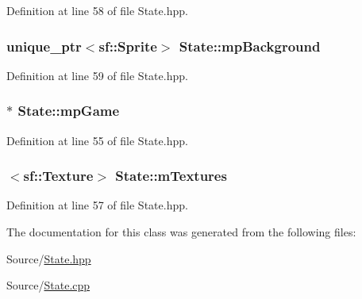 Definition at line 58 of file State.\-hpp.

\hypertarget{class_state_ad77d6e8727cab4ac8ac5d44eacb41eba}{
\subsubsection[{mp\-Background}]{\setlength{\rightskip}{0pt plus 5cm}unique\-\_\-ptr$<$sf\-::\-Sprite$>$ State\-::mp\-Background\hspace{0.3cm}{\ttfamily [protected]}}}\label{class_state_ad77d6e8727cab4ac8ac5d44eacb41eba}


Definition at line 59 of file State.\-hpp.

\hypertarget{class_state_a418f507cf3deef8f3653b8209a9f7b85}{
\subsubsection[{mp\-Game}]{$\ast$ State\-::mp\-Game\hspace{0.3cm}{\ttfamily [protected]}}}\label{class_state_a418f507cf3deef8f3653b8209a9f7b85}


Definition at line 55 of file State.\-hpp.

\hypertarget{class_state_a4eb530bbd8c56bb10ab4e36adeb097d9}{
\subsubsection[{m\-Textures}]{$<$sf\-::\-Texture$>$ State\-::m\-Textures\hspace{0.3cm}{\ttfamily [protected]}}}\label{class_state_a4eb530bbd8c56bb10ab4e36adeb097d9}


Definition at line 57 of file State.\-hpp.



The documentation for this class was generated from the following files\-:\begin{DoxyCompactItemize}
\item 
Source/\hyperlink{_state_8hpp}{State.\-hpp}\item 
Source/\hyperlink{_state_8cpp}{State.\-cpp}\end{DoxyCompactItemize}
